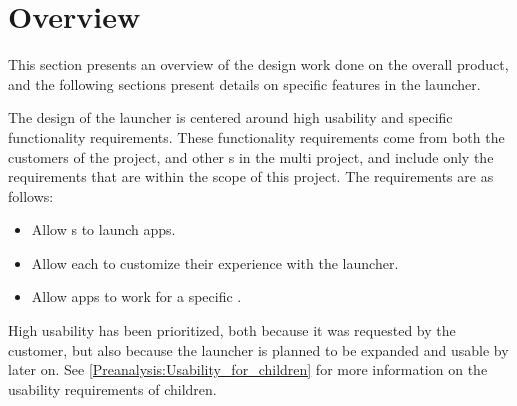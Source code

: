 \chapter{Overview}
\label{sec:design_overview}
This section presents an overview of the design work done on the overall product, and the following sections present details on specific features in the launcher. \newline

The design of the \giraf[] launcher is centered around high usability and specific functionality requirements. 
These functionality requirements come from both the customers of the project, and other \localgroup[]s in the multi project, and include only the requirements that are within the scope of this project. \newline
The requirements are as follows:
\begin{itemize}
\item Allow \guardian[]s to launch apps.
\item Allow each \guardian[] to customize their experience with the launcher. 
\item Allow apps to work for a specific \autist[].
\end{itemize}

High usability has been prioritized, both because it was requested by the customer, but also because the launcher is planned to be expanded and usable by \autists[] later on.
See \autoref{Preanalysis:Usability_for_children} for more information on the usability requirements of children. \newline

